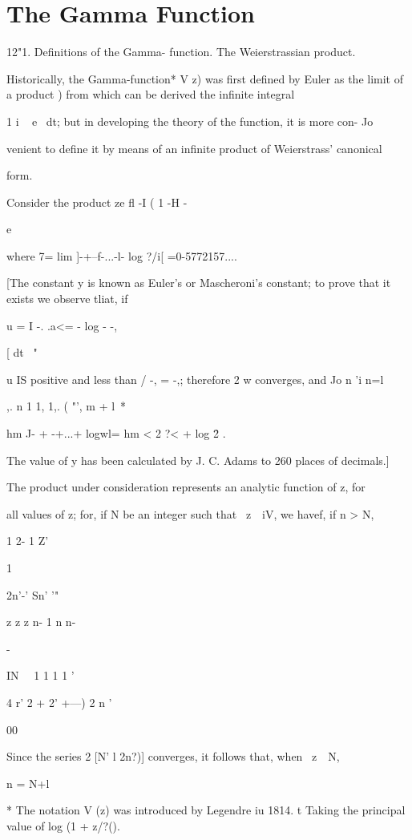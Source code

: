\chapter{The Gamma Function} 

12"1. Definitions of the Gamma- function. The Weierstrassian product.

Historically, the Gamma-function* V z) was first defined by Euler as
the limit of a product ) from which can be derived the
infinite integral

1 i ~ e~ dt; but in developing the theory of the function, it is more
con- Jo

venient to define it by means of an infinite product of Weierstrass'
canonical

form.

Consider the product ze fl -I ( 1 -H -

e

where 7= lim ]-+--f-...-l- log ?/i[ =0-5772157....

[The constant y is known as Euler's or Mascheroni's constant; to
prove that it exists we observe tliat, if

u = I -. .a<= - log - -,

[ dt \ "

u IS positive and less than / -, = -,; therefore 2 w converges, and Jo
n 'i n=l

,. n 1 1, 1,. ( "', m + l\ *

hm J- + -+...+ logwl= hm < 2 ?< + log \= 2 .

The value of y has been calculated by J. C. Adams to 260 places of
decimals.]

The product under consideration represents an analytic function of z,
for

all values of z; for, if N be an integer such that \ z\ \ iV, we
havef, if n > N,

1 2- 1 Z'

1

2n'-' Sn' '"

  

z z z n- 1 n n-

-

IN \ \ 1 1 1 1 '

 4 r' 2 + 2' +---) 2 n '

00

Since the series 2 [N' l 2n?)] converges, it follows that, when \ z\ \
N,

n = N+l

* The notation V (z) was introduced by Legendre iu 1814. t Taking the
principal value of log (1 + z/?().

